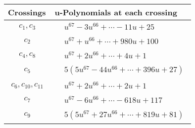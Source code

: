 \documentclass[1p]{elsarticle_modified}
\theoremstyle{definition}
\begin{document}
\begin{tabular}{m{50pt}|m{274pt}}
Crossings & \hspace{64pt}u-Polynomials at each crossing \\
\hline $$\begin{aligned}c_{1},c_{3}\end{aligned}$$&$\begin{aligned}
&u^{67}-3 u^{66}+\cdots-11 u+25
\end{aligned}$\\
\hline $$\begin{aligned}c_{2}\end{aligned}$$&$\begin{aligned}
&u^{67}+u^{66}+\cdots+980 u+100
\end{aligned}$\\
\hline $$\begin{aligned}c_{4},c_{8}\end{aligned}$$&$\begin{aligned}
&u^{67}+2 u^{66}+\cdots+4 u+1
\end{aligned}$\\
\hline $$\begin{aligned}c_{5}\end{aligned}$$&$\begin{aligned}
&5(5 u^{67}-44 u^{66}+\cdots+396 u+27)
\end{aligned}$\\
\hline $$\begin{aligned}c_{6},c_{10},c_{11}\end{aligned}$$&$\begin{aligned}
&u^{67}+2 u^{66}+\cdots+2 u+1
\end{aligned}$\\
\hline $$\begin{aligned}c_{7}\end{aligned}$$&$\begin{aligned}
&u^{67}-6 u^{66}+\cdots-618 u+117
\end{aligned}$\\
\hline $$\begin{aligned}c_{9}\end{aligned}$$&$\begin{aligned}
&5(5 u^{67}+27 u^{66}+\cdots+819 u+81)
\end{aligned}$\\
\hline
\end{tabular}\\~\\
\newpage\renewcommand{\arraystretch}{1}
\end{document}
